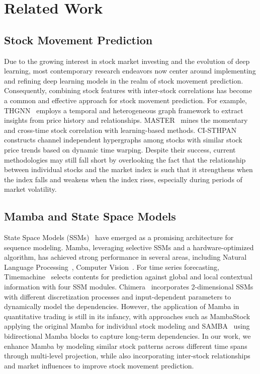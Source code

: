 \section{Related Work}
\subsection{Stock Movement Prediction}
Due to the growing interest in stock market investing and the evolution of deep learning, most contemporary research endeavors now center around implementing and refining deep learning models in the realm of stock movement prediction. 
Consequently, combining stock features with inter-stock correlations has become a common and effective approach for stock movement prediction.
For example, THGNN~\cite{thgnn} employs a temporal and heterogeneous graph framework to extract insights from price history and relationships. MASTER~\cite{master} mines the momentary and cross-time stock correlation with learning-based methods. CI-STHPAN~\cite{cisthpan} constructs channel independent hypergraphs among stocks with similar stock price trends based on dynamic time warping.
Despite their success, current methodologies may still fall short by overlooking the fact that the relationship between individual stocks and the market index is such that it strengthens when the index falls and weakens when the index rises, especially during periods of market volatility.


\subsection{Mamba and State Space Models}
State Space Models (SSMs)~\cite{s4,mamba,mamba2} have emerged as a promising architecture for sequence modeling. Mamba, leveraging selective SSMs and a hardware-optimized algorithm, has achieved strong performance in several areas, including Natural Language Processing~\cite{mamba}, Computer Vision~\cite{mambair, mambavision}. 
For time series forecasting, Timemachine~\cite{timemachine} selects contents
for prediction against global and local contextual information with four SSM modules. Chimera~\cite{chimera} incorporates 2-dimensional SSMs with different discretization processes and input-dependent parameters to dynamically model the dependencies.
However, the application of Mamba in quantitative trading is still in its infancy, with approaches such as MambaStock~\cite{mambastock} applying the original Mamba for individual stock modeling and SAMBA~\cite{samba} using bidirectional Mamba blocks to capture long-term dependencies.
In our work, we enhance Mamba by modeling similar stock patterns across different time spans through multi-level projection, while also incorporating inter-stock relationships and market influences to improve stock movement prediction.